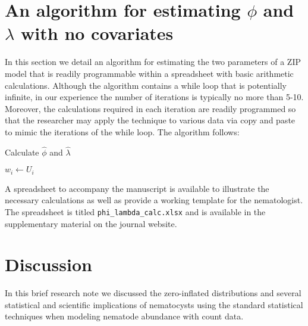 \documentclass{article}
\begin{document}
\section{An algorithm for estimating $\phi$ and $\lambda$ with no covariates}

In this section we detail an algorithm for estimating the two parameters of a ZIP model that is readily programmable within a spreadsheet with basic arithmetic calculations. Although the algorithm contains a while loop that is potentially infinite, in our experience the number of iterations is typically no more than 5-10. Moreover, the calculations required in each iteration are readily programmed so that the researcher may apply the technique to various data via copy and paste to mimic the iterations of the while loop. The algorithm follows: 

\begin{algorithm}
\caption{Calculate $\hat{\phi}$ and $\hat{\lambda}$}
\label{EM_algo}
\begin{algorithmic}
\State $w_i \leftarrow U_i$
\end{algorithmic}
\end{algorithm}

A spreadsheet to accompany the manuscript is available to illustrate the necessary calculations as well as provide a working template for the nematologist. The spreadsheet is titled \texttt{phi\_lambda\_calc.xlsx} and is available in the supplementary material on the journal website. 

\section{Discussion}
In this brief research note we discussed the zero-inflated distributions and several statistical and scientific implications of nematocysts using the standard statistical techniques when modeling nematode abundance with count data. 
\end{document}
